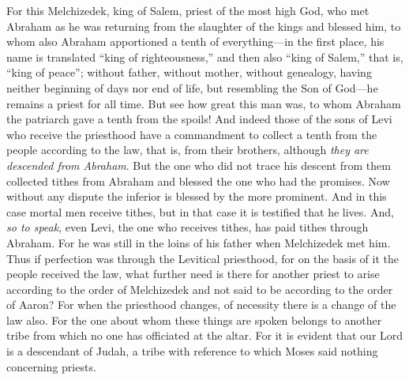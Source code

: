 \begin{biblechapter} %
 For this Melchizedek, king of Salem, priest of the most high God, who met Abraham as he was returning from the slaughter of the kings and blessed him,
\verse to whom also Abraham apportioned a tenth of everything—in the first place, his name is translated “king of righteousness,” and then also “king of Salem,” that is, “king of peace”;
\verse without father, without mother, without genealogy, having neither beginning of days nor end of life, but resembling the Son of God—he remains a priest for all time.
\verse But see how great this man was, to whom Abraham the patriarch gave a tenth from the spoils!
\verse And indeed those of the sons of Levi who receive the priesthood have a commandment to collect a tenth from the people according to the law, that is, from their brothers, although \textit{they are descended from Abraham}.
\verse But the one who did not trace his descent from them collected tithes from Abraham and blessed the one who had the promises.
\verse Now without any dispute the inferior is blessed by the more prominent.
\verse And in this case mortal men receive tithes, but in that case it is testified that he lives.
\verse And, \textit{so to speak}, even Levi, the one who receives tithes, has paid tithes through Abraham.
\verse For he was still in the loins of his father when Melchizedek met him.
 Thus if perfection was through the Levitical priesthood, for on the basis of it the people received the law, what further need is there for another priest to arise according to the order of Melchizedek and not said to be according to the order of Aaron?
\verse For when the priesthood changes, of necessity there is a change of the law also.
\verse For the one about whom these things are spoken belongs to another tribe from which no one has officiated at the altar.
\verse For it is evident that our Lord is a descendant of Judah, a tribe with reference to which Moses said nothing concerning priests.

\end{biblechapter}
